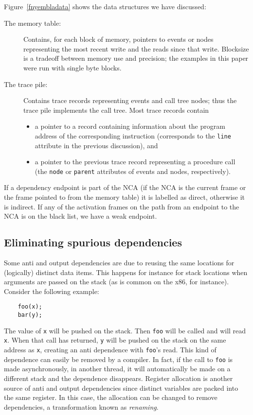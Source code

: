 Figure~\ref{fnyembladata} shows the data structures we have discussed:
\begin{description}
\item[The memory table:]
Contains, for each block of memory, pointers to events or nodes representing
the most recent write and the reads since that write. 
Blocksize is a tradeoff between memory use and precision; the examples in 
this paper were run with single byte blocks. 
\item[The trace pile:]
Contains trace records representing events and call tree nodes; thus the 
trace pile implements the call tree. Most trace records contain 
\begin{itemize}
\item
a pointer to a record containing information about the program 
address of the corresponding instruction (corresponds to the {\tt line} 
attribute in the previous discussion), and
\item
a pointer to the previous trace record representing a procedure call (the 
{\tt node} or {\tt parent} attributes of events and nodes, respectively).
\end{itemize}
\end{description}

If a dependency endpoint is part of the NCA (if the NCA is the current
frame or the frame pointed to from the memory table) it is labelled as
direct, otherwise it is indirect. If any of the activation frames on
the path from an endpoint to the NCA is on the black list, we have a
weak endpoint.

\subsection{Eliminating spurious dependencies}

Some anti and output dependencies are due to reusing the same
locations for (logically) distinct data items. This happens for
instance for stack locations when arguments are passed on the stack
(as is common on the x86, for instance). Consider the following
example:
\begin{verbatim}
    foo(x);
    bar(y);
\end{verbatim}
The value of {\tt x} will be pushed on the stack. Then {\tt foo} will
be called and will read {\tt x}. When that call has returned, {\tt y}
will be pushed on the stack on the same address as {\tt x}, creating
an anti dependence with {\tt foo}'s read. This kind of dependence can 
easily be removed by a
compiler. In fact, if the call to {\tt foo} is made asynchronously, in
another thread, it will automatically be made on a different stack and
the dependence disappears. Register allocation is another source of
anti and output dependencies since distinct variables are packed into
the same register. In this case, the allocation can be changed to
remove dependencies, a transformation known as {\em renaming}.

